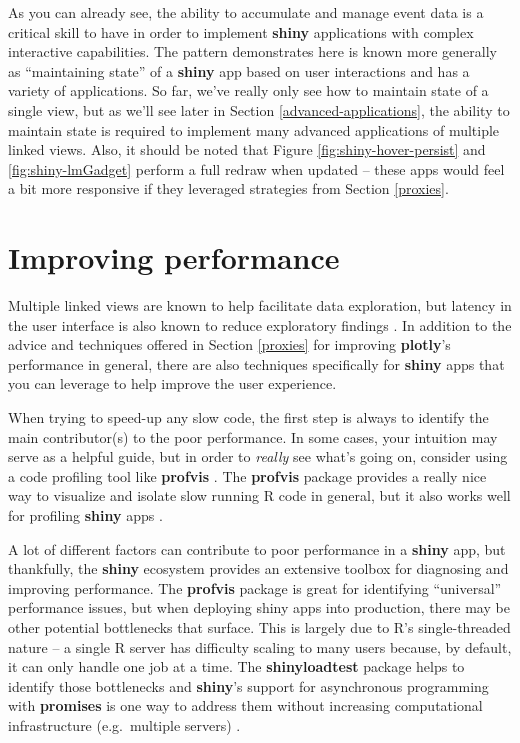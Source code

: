 \documentclass[
  12pt,
]{krantz}
\begin{document}
As you can already see, the ability to accumulate and manage event data is a critical skill to have in order to implement \textbf{shiny} applications with complex interactive capabilities. The pattern demonstrates here is known more generally as ``maintaining state'' of a \textbf{shiny} app based on user interactions and has a variety of applications. So far, we've really only see how to maintain state of a single view, but as we'll see later in Section \ref{advanced-applications}, the ability to maintain state is required to implement many advanced applications of multiple linked views. Also, it should be noted that Figure \ref{fig:shiny-hover-persist} and \ref{fig:shiny-lmGadget} perform a full redraw when updated -- these apps would feel a bit more responsive if they leveraged strategies from Section \ref{proxies}.

\hypertarget{shiny-performance}{%
\section{Improving performance}\label{shiny-performance}}

Multiple linked views are known to help facilitate data exploration, but latency in the user interface is also known to reduce exploratory findings \citep{2014-latency}. In addition to the advice and techniques offered in Section \ref{proxies} for improving \textbf{plotly}'s performance in general, there are also techniques specifically for \textbf{shiny} apps that you can leverage to help improve the user experience.

When trying to speed-up any slow code, the first step is always to identify the main contributor(s) to the poor performance. In some cases, your intuition may serve as a helpful guide, but in order to \emph{really} see what's going on, consider using a code profiling tool like \textbf{profvis} \citep{profvis}. The \textbf{profvis} package provides a really nice way to visualize and isolate slow running R code in general, but it also works well for profiling \textbf{shiny} apps \citep{profvis-shiny}.

A lot of different factors can contribute to poor performance in a \textbf{shiny} app, but thankfully, the \textbf{shiny} ecosystem provides an extensive toolbox for diagnosing and improving performance. The \textbf{profvis} package is great for identifying ``universal'' performance issues, but when deploying shiny apps into production, there may be other potential bottlenecks that surface. This is largely due to R's single-threaded nature -- a single R server has difficulty scaling to many users because, by default, it can only handle one job at a time. The \textbf{shinyloadtest} package helps to identify those bottlenecks and \textbf{shiny}'s support for asynchronous programming with \textbf{promises} is one way to address them without increasing computational infrastructure (e.g.~multiple servers) \citep{shinyloadtest, promises}.
\end{document}
